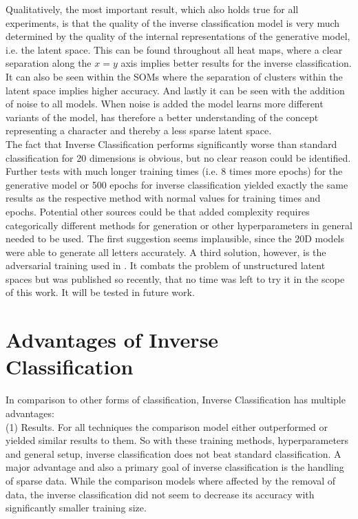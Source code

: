 Qualitatively, the most important result, which also holds true for all experiments, is that the quality of the inverse classification model is very much determined by the quality of the internal representations of the generative model, i.e. the latent space. This can be found throughout all heat maps, where a clear separation along the $x=y$ axis implies better results for the inverse classification. It can also be seen within the SOMs where the separation of clusters within the latent space implies higher accuracy. And lastly it can be seen with the addition of noise to all models. When noise is added the model learns more different variants of the model, has therefore a better understanding of the concept representing a character and thereby a less sparse latent space.\\
The fact that Inverse Classification performs significantly worse than standard classification for 20 dimensions is obvious, but no clear reason could be identified. Further tests with much longer training times (i.e. 8 times more epochs) for the generative model or 500 epochs for inverse classification yielded exactly the same results as the respective method with normal values for training times and epochs. Potential other sources could be that added complexity requires categorically different methods for generation or other hyperparameters in general needed to be used. The first suggestion seems implausible, since the 20D models were able to generate all letters accurately. A third solution, however, is the adversarial training used in \cite{Wiese2018}. It combats the problem of unstructured latent spaces but was published so recently, that no time was left to try it in the scope of this work. It will be tested in future work.

\section{Advantages of Inverse Classification}

In comparison to other forms of classification, Inverse Classification has multiple advantages: \\

(1) Results. For all techniques the comparison model either outperformed or yielded similar results to them. So with these training methods, hyperparameters and general setup, inverse classification does not beat standard classification. A major advantage and also a primary goal of inverse classification is the handling of sparse data. While the comparison models where affected by the removal of data, the inverse classification did not seem to decrease its accuracy with significantly smaller training size. \\

